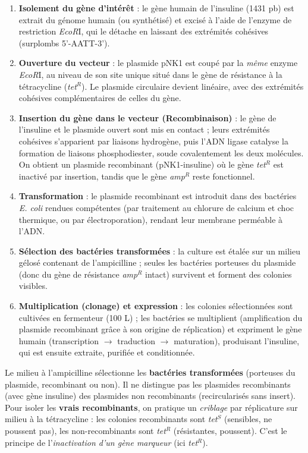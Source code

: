 \documentclass[11pt]{article}
\newcommand{\cle}[1]{{\popxbold\color{popdark}#1}}
\begin{document}
\begin{exoresolu}
\begin{enumerate}
\item \textbf{Isolement du gène d'intérêt} : le gène humain de l'insuline (1431 pb) est extrait du génome humain (ou synthétisé) et excisé à l'aide de l'\cle{enzyme de restriction} \emph{EcoR}I, qui le détache en laissant des extrémités cohésives (surplombs 5'-AATT-3').
\item \textbf{Ouverture du vecteur} : le plasmide pNK1 est coupé par la \emph{même} enzyme \emph{EcoR}I, au niveau de son site unique situé dans le gène de résistance à la tétracycline (\textit{tet}$^R$). Le plasmide circulaire devient linéaire, avec des extrémités cohésives complémentaires de celles du gène.
\item \textbf{Insertion du gène dans le vecteur (Recombinaison)} : le gène de l'insuline et le plasmide ouvert sont mis en contact ; leurs extrémités cohésives s'apparient par liaisons hydrogène, puis l'\cle{ADN ligase} catalyse la formation de liaisons phosphodiester, soude covalentement les deux molécules. On obtient un \cle{plasmide recombinant} (pNK1-insuline) où le gène \textit{tet}$^R$ est inactivé par insertion, tandis que le gène \textit{amp}$^R$ reste fonctionnel.
\item \textbf{Transformation} : le plasmide recombinant est introduit dans des bactéries \emph{E. coli} rendues compétentes (par traitement au chlorure de calcium et choc thermique, ou par électroporation), rendant leur membrane perméable à l'ADN.
\item \textbf{Sélection des bactéries transformées} : la culture est étalée sur un milieu gélosé contenant de l'ampicilline ; seules les bactéries porteuses du plasmide (donc du gène de résistance \textit{amp}$^R$ intact) survivent et forment des colonies visibles.
\item \textbf{Multiplication (clonage) et expression} : les colonies sélectionnées sont cultivées en fermenteur (100 L) ; les bactéries se multiplient (amplification du plasmide recombinant grâce à son \cle{origine de réplication}) et expriment le gène humain (transcription $\rightarrow$ traduction $\rightarrow$ maturation), produisant l'insuline, qui est ensuite extraite, purifiée et conditionnée.
\end{enumerate}

\begin{attention}
Le milieu à l'ampicilline sélectionne les \textbf{bactéries transformées} (porteuses du plasmide, recombinant ou non). Il ne distingue pas les plasmides recombinants (avec gène insuline) des plasmides non recombinants (recircularisés sans insert). Pour isoler les \textbf{vrais recombinants}, on pratique un \emph{criblage} par réplicature sur milieu à la tétracycline : les colonies recombinants sont \textit{tet}$^S$ (sensibles, ne poussent pas), les non-recombinants sont \textit{tet}$^R$ (résistantes, poussent). C'est le principe de l'\emph{inactivation d'un gène marqueur} (ici \textit{tet}$^R$).
\end{attention}


\end{exoresolu}
\end{document}
